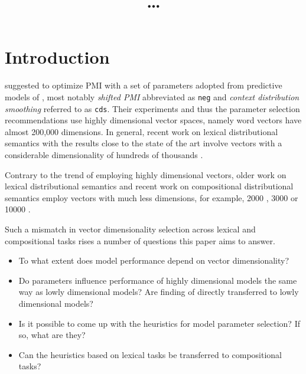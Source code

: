 \documentclass[11pt,letterpaper]{article}
\title{\ldots}
\date{}
\begin{document}
\def\emnlp/{\textit{KS2013}}
\def\PhraseRel/{PhraseRel}

\def\PMI/{$1 \operatorname{PMI}$}
\def\PPMI/{$1 \operatorname{PosPMI}$}
\def\NPMI/{$n \operatorname{PMI}$}
\def\NPPMI/{$n \operatorname{PosPMI}$}
\def\NITTF/{$n \operatorname{ITTF}$}
\def\logNPMI/{$\log n\operatorname{PMI}$}
\def\logNPPMI/{$\log n\operatorname{PosPMI}$}
\def\logNITTF/{$\log n\operatorname{ITTF}$}

\maketitle
\begin{abstract}

\end{abstract}

\section{Introduction}
\label{sec:introduction}

 suggested to optimize PMI with a  set of parameters adopted from predictive models of , most notably \emph{shifted PMI} abbreviated as \texttt{neg} and \emph{context distribution smoothing} referred to as \texttt{cds}. Their experiments and thus the parameter selection recommendations use highly dimensional vector spaces, namely word vectors have almost 200,000 dimensions. In general, recent work on lexical distributional semantics with the results close to the state of the art involve vectors with a considerable dimensionality of hundreds of thousands \cite{baroni-dinu-kruszewski:2014:P14-1,kiela-clark:2014:CVSC}.

Contrary to the trend of employing highly dimensional vectors, older work on lexical distributional semantics and recent work on compositional distributional semantics employ vectors with much less dimensions, for example, 2000 \cite{Grefenstette:2011:ESC:2145432.2145580,kartsadrqpl2014,milajevs-EtAl:2014:EMNLP2014}, 3000 \cite{Dinu:2010:MDS:1870658.1870771,milajevs-purver:2014:CVSC} or 10000 \cite{polajnar-clark:2014:EACL,Baroni2010nouns}.

Such a mismatch in vector dimensionality selection across lexical and compositional tasks rises a number of questions this paper aims to answer.
\begin{itemize}
\item To what extent does model performance depend on vector dimensionality?
\item Do parameters influence performance of highly dimensional models the same way as lowly dimensional models? Are finding of  directly transferred to lowly dimensional models?
\item Is it possible to come up with the heuristics for model parameter selection? If so, what are they?
\item Can the heuristics based on lexical tasks be transferred to compositional tasks?
\end{itemize}
\end{document}
